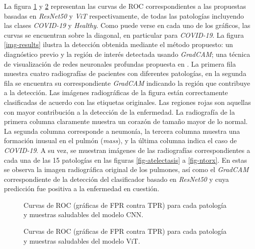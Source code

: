 La figura \ref{roc-curves-cnn} y \ref{roc-curves-vit} representan las curvas de ROC correspondientes
a las propuestas basadas en \textit{ResNet50} y \textit{ViT} respectivamente, de todas las patologías
incluyendo las clases \textit{COVID-19} y \textit{Healthy}. Como puede verse en cada uno de los
gráficos, las curvas se encuentran sobre la diagonal, en particular para \textit{COVID-19}. La figura
\ref{img-results} ilustra la detección obtenida mediante el método propuesto: un diagnóstico previo
y la región de interés detectada usando \textit{GradCAM}; una técnica de visualización de redes neuronales
profundas propuesta en \cite{selvaraju2017grad}. La primera fila muestra cuatro radiografías de
pacientes con diferentes patologías, en la segunda fila se encuentra su correspondiente \textit{GradCAM}
indicando la región que contribuye a la detección. Las imágenes radiográficas de la figura están
correctamente clasificadas de acuerdo con las etiquetas originales. Las regiones rojas son aquellas
con mayor contribución a la detección de la enfermedad. La radiografía de la primera columna claramente
muestra un corazón de tamaño mayor de lo normal. La segunda columna corresponde a neumonía, la
tercera columna muestra una formación inusual en el pulmón (\textit{mass}), y la última columna indica
el caso de \textit{COVID-19}. A su vez, se muestran imágenes de las radiografías correspondientes a cada
una de las 15 patologías en las figuras \ref{fig-atelectasis} a \ref{fig-ntorx}. En estas se observa
la imagen radiográfica original de los pulmones, así como el \textit{GradCAM} correspondiente de la
detección del clasificador basado en \textit{ResNet50} y cuya predicción fue positiva a la enfermedad
en cuestión.


\begin{figure}
    \begin{center}
        \scalebox{0.6}{}
    \end{center}
    \caption{Curvas de ROC (gráficas de FPR contra TPR) para cada patología y muestras saludables
    del modelo CNN.}
    \label{roc-curves-cnn}
\end{figure}

\begin{figure}
    \begin{center}
        \scalebox{0.6}{}
    \end{center}
    \caption{Curvas de ROC (gráficas de FPR contra TPR) para cada patología y muestras saludables
             del modelo ViT.}
    \label{roc-curves-vit}
\end{figure}

